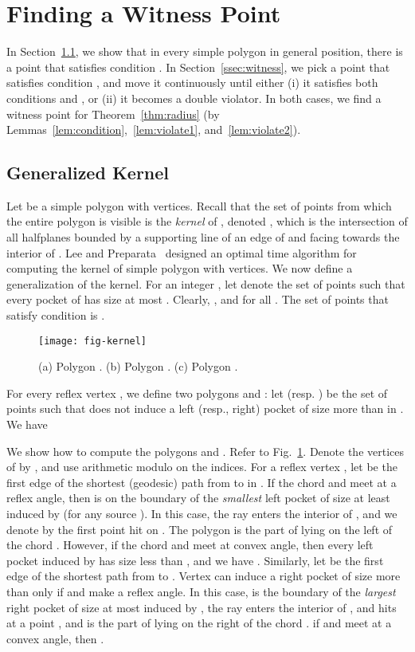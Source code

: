 \documentclass[12pt]{article}
\begin{document}
\section{Finding a Witness Point}
\label{sec:center}

In Section~\ref{ssec:kernel}, we show that in every simple polygon  in general position, there is a point  that satisfies condition .
In Section~\ref{ssec:witness}, we pick a point  that satisfies condition , and move it continuously until either (i) it satisfies both conditions  and , or (ii) it becomes a double violator. In both cases, we find a witness point for Theorem~\ref{thm:radius} (by Lemmas~\ref{lem:condition},~\ref{lem:violate1}, and~\ref{lem:violate2}).

\subsection{Generalized Kernel}
\label{ssec:kernel}

Let  be a simple polygon with  vertices. Recall that the set of points from which the entire polygon  is visible is the \emph{kernel} of , denoted , which is the intersection of all halfplanes bounded by a supporting line of an edge of  and facing towards the interior of . Lee and Preparata~\cite{LeePreparata79} designed an optimal  time algorithm for computing the kernel of simple polygon with  vertices. We now define a generalization of the kernel. For an integer , let  denote the set of points 
such that every pocket of  has size at most . Clearly, , and  for all . The set of points that satisfy condition  is .

\begin{figure}[htp]
  \centering
  \texttt{[image: fig-kernel]}
  \caption{\label{fig:kernel}
(a) Polygon .
(b) Polygon .
(c) Polygon .}
\end{figure}

For every reflex vertex , we define two polygons  and :
let  (resp. ) be the set of points  such that  does not induce a left (resp., right) pocket of size more than  in . We have



We show how to compute the polygons  and . Refer to Fig.~\ref{fig:kernel}. Denote the vertices of  by , and use arithmetic modulo  on the indices.
For a reflex vertex , let  be the first edge of the shortest (geodesic) path from  to  in . If the chord  and  meet at a reflex angle, then  is on the boundary of the \emph{smallest} left pocket of size at least  induced by  (for any source ). In this case, the ray  enters the interior of , and we denote by  the first point hit on . The polygon  is the part of  lying on the left of the chord . However, if the chord  and  meet at convex angle, then every left pocket induced by  has size less than , and we have .
Similarly, let  be the first edge of the shortest path from  to . Vertex  can induce a right pocket of size more than  only if  and  make a reflex angle. In this case,  is the boundary of the \emph{largest} right pocket of size at most  induced by , the ray   enters the interior of , and hits  at a point , and  is the part of  lying on the right of the chord . if  and  meet at a convex angle, then .
\end{document}
